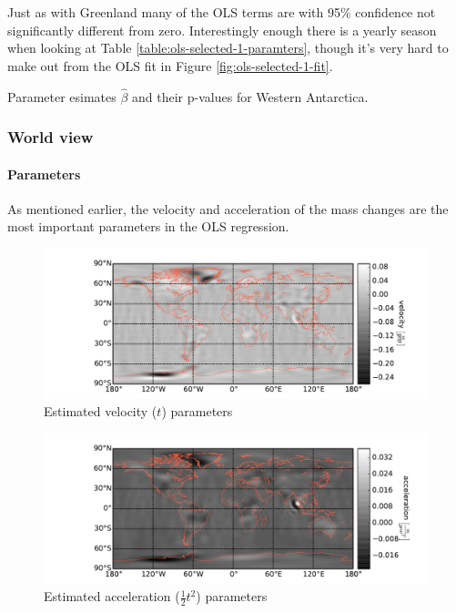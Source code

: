 Just as with Greenland many of the OLS terms are with 95\% confidence not significantly different from zero. Interestingly enough there is a yearly season when looking at Table \ref{table:ols-selected-1-paramters}, though it's very hard to make out from the OLS fit in Figure \ref{fig:ols-selected-1-fit}.

\begin{table}[H]
\centering
\centerline{}
\caption{Parameter esimates $\hat{\beta}$ and their p-values for Western Antarctica. }
\label{table:ols-selected-1-paramters}
\end{table}

\pagebreak
\subsubsection{World view}

\paragraph{Parameters}

As mentioned earlier, the velocity and acceleration of the mass changes are the most important parameters in the OLS regression.
\begin{figure}[H]
	\centering
	\includegraphics[width=\textwidth]{figures/ols-world-parameter-vel}
	\caption{Estimated velocity ($t$) parameters}
	\label{fig:ols-world-parameter-vel}
\end{figure}

\begin{figure}[H]
	\centering
	\includegraphics[width=\textwidth]{figures/ols-world-parameter-acc}
	\caption{Estimated acceleration ($\frac{1}{2} t^2$) parameters}
	\label{fig:ols-world-parameter-acc}
\end{figure}

